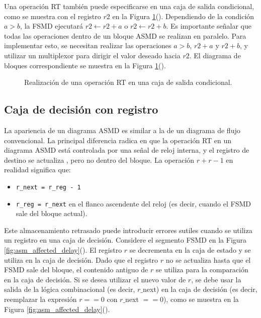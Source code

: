     Una operación RT también puede especificarse en una caja de salida condicional, como se muestra con el registro $r2$ en la Figura \ref{fig:asmd_rt_figure}(). Dependiendo de la condición $a>b$, la FSMD ejecutará $r2 \leftarrow r2+a$ o $r2 \leftarrow r2+b$. Es importante señalar que todas las operaciones dentro de un bloque ASMD se realizan en paralelo. Para implementar esto, se necesitan realizar las operaciones $a>b$, $r2+a$ y $r2+b$, y utilizar un multiplexor para dirigir el valor deseado hacia $r2$. El diagrama de bloques correspondiente se muestra en la Figura \ref{fig:asmd_rt_figure}().

    \begin{figure}[!h]
        \centering
        \caption{Realización de una operación RT en una caja de salida condicional.}
        \label{fig:asmd_rt_figure}
    \end{figure}

    \subsection{Caja de decisión con registro}

    La apariencia de un diagrama ASMD es similar a la de un diagrama de flujo convencional. La principal diferencia radica en que la operación RT en un diagrama ASMD está controlada por una señal de reloj interna, y el registro de destino se actualiza , pero no dentro del bloque. La operación $r + r-1$ en realidad significa que:

    \begin{itemize}
      \item \texttt{r\_next = r\_reg - 1}
      \item \texttt{r\_reg = r\_next} en el flanco ascendente del reloj (es decir, cuando el FSMD sale del bloque actual).
    \end{itemize}

    Este almacenamiento retrasado puede introducir errores sutiles cuando se utiliza un registro en una caja de decisión. Considere el segmento FSMD en la Figura \ref{fig:asm_affected_delay}(). El registro $r$ se decrementa en la caja de estado y se utiliza en la caja de decisión. Dado que el registro $r$ no se actualiza hasta que el FSMD sale del bloque, el contenido antiguo de $r$ se utiliza para la comparación en la caja de decisión. Si se desea utilizar el nuevo valor de $r$, se debe usar la salida de la lógica combinacional (es decir, $r\_$next) en la caja de decisión (es decir, reemplazar la expresión $r == 0$ con $r\_$next $==0$), como se muestra en la Figura \ref{fig:asm_affected_delay}().

